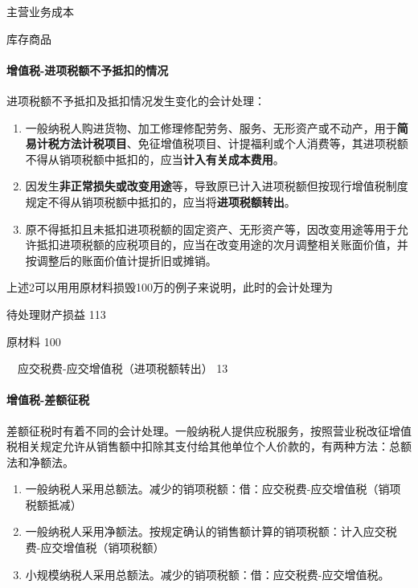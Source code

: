 \documentclass[UTF8,12pt]{ctexart}
\newenvironment{Dr}{%
	\begin{list}{}%
		{
			\setlength{\leftmargin}{2em}
			\setlength{\labelwidth}{2em}
			\setlength{\labelsep}{0pt}
			\setlength{\itemindent}{0pt}
			\setlength{\listparindent}{0pt}
			\setlength{\parsep}{0pt}
			\setlength{\topsep}{0pt}
		}
		\item[\textbf{借：}]
	}{%
	\end{list}
}
\newenvironment{Cr}{%
	\begin{list}{}%
		{
			\setlength{\leftmargin}{2em}
			\setlength{\labelwidth}{2em}
			\setlength{\labelsep}{0pt}
			\setlength{\itemindent}{0pt}
			\setlength{\listparindent}{0pt}
			\setlength{\parsep}{0pt}
			\setlength{\topsep}{0pt}
		}
		\item[\textbf{贷：}]
	}{%
	\end{list}
}
\numberwithin{equation}{section} %
\numberwithin{figure}{section}
\numberwithin{table}{section}
\begin{document}
	\begin{Dr}
		主营业务成本
	\end{Dr}
	\begin{Cr}
		库存商品
	\end{Cr}

	
	\paragraph{增值税-进项税额不予抵扣的情况}进项税额不予抵扣及抵扣情况发生变化的会计处理：
	\begin{enumerate}
		\item 一般纳税人购进货物、加工修理修配劳务、服务、无形资产或不动产，用于\textbf{简易计税方法计税项目}、免征增值税项目、计提福利或个人消费等，其进项税额不得从销项税额中抵扣的，应当\textbf{计入有关成本费用}。
		
		\item 因发生\textbf{非正常损失或改变用途}等，导致原已计入进项税额但按现行增值税制度规定不得从销项税额中抵扣的，应当将\textbf{进项税额转出}。
		
		\item 原不得抵扣且未抵扣进项税额的固定资产、无形资产等，因改变用途等用于允许抵扣进项税额的应税项目的，应当在改变用途的次月调整相关账面价值，并按调整后的账面价值计提折旧或摊销。
	\end{enumerate}

	上述2可以用用原材料损毁100万的例子来说明，此时的会计处理为
	
	\begin{Dr}
		待处理财产损益 113
	\end{Dr}
	\begin{Cr}
		原材料 100
		
		\ \ 应交税费-应交增值税（进项税额转出） 13
	\end{Cr}

	\paragraph{增值税-差额征税}差额征税时有着不同的会计处理。一般纳税人提供应税服务，按照营业税改征增值税相关规定允许从销售额中扣除其支付给其他单位个人价款的，有两种方法：总额法和净额法。
	
	\begin{enumerate}
		\item 一般纳税人采用总额法。减少的销项税额：借：应交税费-应交增值税（销项税额抵减）
		
		\item 一般纳税人采用净额法。按规定确认的销售额计算的销项税额：计入应交税费-应交增值税（销项税额）
		
		\item 小规模纳税人采用总额法。减少的销项税额：借：应交税费-应交增值税。
	\end{enumerate}
\end{document}
